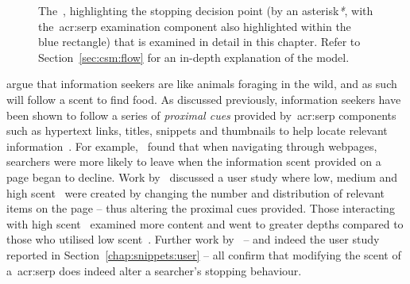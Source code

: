\begin{figure}[t!]
    \centering
    \caption[The~\gls{acr:csm} and~\gls{acr:serp} stopping point]{The~, highlighting the stopping decision point (by an asterisk\emph{*}, with the~\gls{acr:serp} examination component also highlighted within the blue rectangle) that is examined in detail in this chapter. Refer to Section~\ref{sec:csm:flow} for an in-depth explanation of the model.}
    \label{fig:csm_ch9}
\end{figure}


\cite{pirolli1999ift} argue that information seekers are like animals foraging in the wild, and as such will follow a scent to find food. As discussed previously, information seekers have been shown to follow a series of \emph{proximal cues} provided by~\gls{acr:serp} components such as hypertext links, titles, snippets and thumbnails to help locate relevant information~\citep{pirolli1995ift, pirolli1999ift, chi2001information_scent, oltston2003scenttrails, pirolli2007ift}. For example,~\cite{card2001scent_graphs} found that when navigating through webpages, searchers were more likely to leave when the information scent provided on a page began to decline. Work by~\cite{wu2014information_scent} discussed a user study where low, medium and high scent~ were created by changing the number and distribution of relevant items on the page -- thus altering the proximal cues provided. Those interacting with high scent~ examined more content and went to greater depths compared to those who utilised low scent~. Further work by~\cite{ong2017scent_behaviour} -- and indeed the user study reported in Section~\ref{chap:snippets:user} -- all confirm that modifying the scent of a~\gls{acr:serp} does indeed alter a searcher's stopping behaviour.

